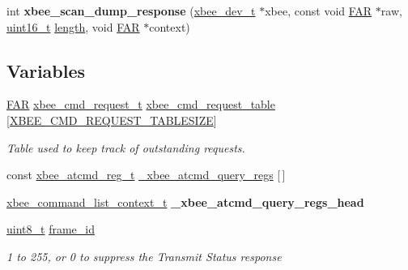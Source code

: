 \begin{DoxyCompactItemize}
\mbox{\label{group__xbee__atcmd_gaf0bac69b2b0db9bb2130de80697583f4}} 
int {\bfseries xbee\+\_\+scan\+\_\+dump\+\_\+response} (\hyperlink{structxbee__dev__t}{xbee\+\_\+dev\+\_\+t} $\ast$xbee, const void \hyperlink{group__hal_gaef060b3456fdcc093a7210a762d5f2ed}{F\+AR} $\ast$raw, \hyperlink{group__hal__dos_ga5a8b2dc9e45a9ee81a94ef304fb62505}{uint16\+\_\+t} \hyperlink{group__zdo_gab2b3adeb2a67e656ff030b56727fd0ac}{length}, void \hyperlink{group__hal_gaef060b3456fdcc093a7210a762d5f2ed}{F\+AR} $\ast$context)
\end{DoxyCompactItemize}
\subsection*{Variables}
\begin{DoxyCompactItemize}
\item 
\mbox{\label{group__xbee__atcmd_ga551531248de3d539dfb15bd89cf4734b}} 
\hyperlink{group__hal_gaef060b3456fdcc093a7210a762d5f2ed}{F\+AR} \hyperlink{structxbee__cmd__request__t}{xbee\+\_\+cmd\+\_\+request\+\_\+t} \hyperlink{group__xbee__atcmd_ga551531248de3d539dfb15bd89cf4734b}{xbee\+\_\+cmd\+\_\+request\+\_\+table} \mbox{[}\hyperlink{group__xbee__atcmd_gaf992e9b985e2b1eb185ef3d2d38a01c0}{X\+B\+E\+E\+\_\+\+C\+M\+D\+\_\+\+R\+E\+Q\+U\+E\+S\+T\+\_\+\+T\+A\+B\+L\+E\+S\+I\+ZE}\mbox{]}
\begin{DoxyCompactList}\small\item\em Table used to keep track of outstanding requests. \end{DoxyCompactList}\item 
const \hyperlink{structxbee__atcmd__reg__t}{xbee\+\_\+atcmd\+\_\+reg\+\_\+t} \hyperlink{group__xbee__atcmd_ga0b78107b2303165b7cf9969125064dcc}{\+\_\+xbee\+\_\+atcmd\+\_\+query\+\_\+regs} \mbox{[}$\,$\mbox{]}
\item 
\mbox{\label{group__xbee__atcmd_ga6cd73a1bba0cb3c1766f7f7d5d2123ea}} 
\hyperlink{structxbee__command__list__context__t}{xbee\+\_\+command\+\_\+list\+\_\+context\+\_\+t} {\bfseries \+\_\+xbee\+\_\+atcmd\+\_\+query\+\_\+regs\+\_\+head}
\item 
\hyperlink{group__hal__dos_gae1affc9ca37cfb624959c866a73f83c2}{uint8\+\_\+t} \hyperlink{group__xbee__atcmd_ga03c1016ac46b9df250b994f242cf956a}{frame\+\_\+id}
\begin{DoxyCompactList}\small\item\em 1 to 255, or 0 to suppress the Transmit Status response \end{DoxyCompactList}\item 

\end{DoxyCompactItemize}
